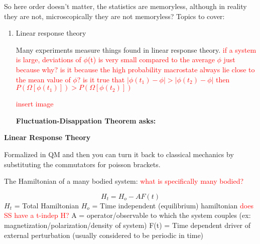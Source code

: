 \documentclass{article}
\begin{document}
So here order doesn't matter, the statistics are memoryless, although in reality they are not, microscopically they are not memoryless? \newline 
\newline
Topics to cover:
\begin{enumerate}

\item Linear response theory

Many experiments measure things found in linear response theory. \textcolor{red}{ if a system is large, deviations of $\phi$(t) is very small compared to the average $\phi$ just because why? is it because the high probability macrostate always lie close to the mean value of $\phi$? is it true that $\vert\phi(t_1)-\phi\vert>\vert\phi(t_2)-\phi\vert$ then $P(\Omega[\phi(t_1)])>P(\Omega[\phi(t_2)])$}
\newline
\newline

\textcolor{red}{insert image}

\textbf{Fluctuation-Disappation Theorem asks:}

\end{enumerate}


\textbf{Linear Response Theory}

Formalized in QM and then you can turn it back to classical mechanics by substituting the commutators for poisson brackets.

The Hamiltonian of a many bodied system: \textcolor{red}{what is specifically many bodied?}

\begin{equation}
H_t=H_o-AF(t)
\end{equation}
$H_t$ = Total Hamiltonian
\newline
$H_o$ = Time independent (equilibrium) hamiltonian \textcolor{red}{does SS have a t-indep H?}
\newline
A = operator/observable to which the system couples (ex: magnetization/polarization/density of system)
\newline
F(t) = Time dependent driver of external perturbation (usually considered to be periodic in time)

\vspace{5mm} 
\end{document}
